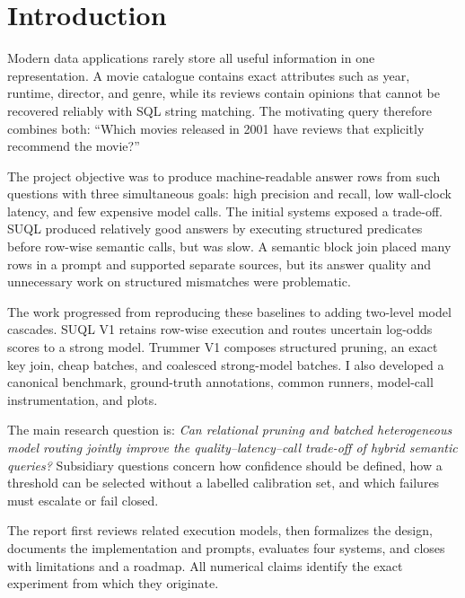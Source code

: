 \chapter{Introduction}
Modern data applications rarely store all useful information in one representation.
A movie catalogue contains exact attributes such as year, runtime, director, and
genre, while its reviews contain opinions that cannot be recovered reliably with
SQL string matching. The motivating query therefore combines both: ``Which movies
released in 2001 have reviews that explicitly recommend the movie?''

The project objective was to produce machine-readable answer rows from such
questions with three simultaneous goals: high precision and recall, low wall-clock
latency, and few expensive model calls. The initial systems exposed a trade-off.
SUQL produced relatively good answers by executing structured predicates before
row-wise semantic calls, but was slow. A semantic block join placed many rows in a
prompt and supported separate sources, but its answer quality and unnecessary work
on structured mismatches were problematic.

The work progressed from reproducing these baselines to adding two-level model
cascades. SUQL V1 retains row-wise execution and routes uncertain log-odds scores to
a strong model. Trummer V1 composes structured pruning, an exact key join, cheap
batches, and coalesced strong-model batches. I also developed a canonical benchmark,
ground-truth annotations, common runners, model-call instrumentation, and plots.

The main research question is: \emph{Can relational pruning and batched heterogeneous
model routing jointly improve the quality--latency--call trade-off of hybrid semantic
queries?} Subsidiary questions concern how confidence should be defined, how a
threshold can be selected without a labelled calibration set, and which failures
must escalate or fail closed.

The report first reviews related execution models, then formalizes the design,
documents the implementation and prompts, evaluates four systems, and closes with
limitations and a roadmap. All numerical claims identify the exact experiment from
which they originate.
